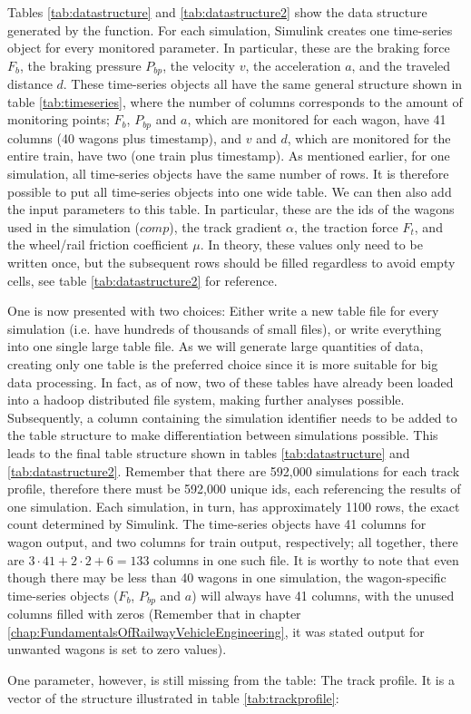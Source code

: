 \par\noindent
Tables \ref{tab:datastructure} and \ref{tab:datastructure2} show the data structure generated by the  function. For each simulation, Simulink creates one time-series object for every monitored parameter. In particular, these are the braking force $F_{b}$, the braking pressure $P_{bp}$, the velocity $v$, the acceleration $a$, and the traveled distance $d$. These time-series objects all have the same general structure shown in table \ref{tab:timeseries}, where the number of columns corresponds to the amount of monitoring points; $F_{b}$, $P_{bp}$ and $a$, which are monitored for each wagon, have 41 columns (40 wagons plus timestamp), and $v$ and $d$, which are monitored for the entire train, have two (one train plus timestamp). As mentioned earlier, for one simulation, all time-series objects have the same number of rows. It is therefore possible to put all time-series objects into one wide table. We can then also add the input parameters to this table. In particular, these are the ids of the wagons used in the simulation ($comp$), the track gradient $\alpha$, the traction force $F_{t}$, and the wheel/rail friction coefficient $\mu$. In theory, these values only need to be written once, but the subsequent rows should be filled regardless to avoid empty cells, see table \ref{tab:datastructure2} for reference. 
\par
One is now presented with two choices: Either write a new table file for every simulation (i.e. have hundreds of thousands of small files), or write everything into one single large table file. As we will generate large quantities of data, creating only one table is the preferred choice since it is more suitable for big data processing. In fact, as of now, two of these tables have already been loaded into a hadoop distributed file system, making further analyses possible. Subsequently, a column containing the simulation identifier needs to be added to the table structure to make differentiation between simulations possible. This leads to the final table structure shown in tables \ref{tab:datastructure} and \ref{tab:datastructure2}. Remember that there are 592,000 simulations for each track profile, therefore there must be 592,000 unique ids, each referencing the results of one simulation. Each simulation, in turn, has approximately 1100 rows, the exact count determined by Simulink. The time-series objects have 41 columns for wagon output, and two columns for train output, respectively; all together, there are $3 \cdot 41 + 2 \cdot 2 + 6 = 133$ columns in one such file. It is worthy to note that even though there may be less than 40 wagons in one simulation, the wagon-specific time-series objects ($F_{b}$, $P_{bp}$ and $a$) will always have 41 columns, with the unused columns filled with zeros (Remember that in chapter \ref{chap:FundamentalsOfRailwayVehicleEngineering}, it was stated output for unwanted wagons is set to zero values).
\par
One parameter, however, is still missing from the table: The track profile. It is a vector of the structure illustrated in table \ref{tab:trackprofile}:

